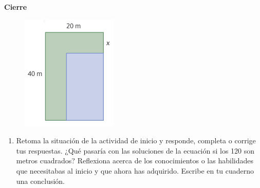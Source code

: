 \documentclass[11pt]{book}
\begin{document}
\begin{boxK}
  \begin{center}\textbf{Cierre}\end{center}

  \begin{minipage}[t]{0.2\textwidth}
    \begin{figure}[H]
      \centering
      \includegraphics[width=\linewidth]{s7l1_cierre.png}
      \label{fig:s7l1_cierre}
    \end{figure}
  \end{minipage}\hfill
  \begin{minipage}[t]{0.8\textwidth}
    \begin{enumerate}
      \item Retoma la situación de la actividad de inicio y responde, completa o corrige
            tus respuestas. ¿Qué pasaría con las soluciones de la ecuación si los 120 son
            metros cuadrados?
            Reflexiona acerca de los conocimientos o las habilidades que necesitabas al
            inicio y que ahora has adquirido. Escribe en tu cuaderno una conclusión.

\end{enumerate}
\end{minipage}
\end{boxK}
\end{document}
